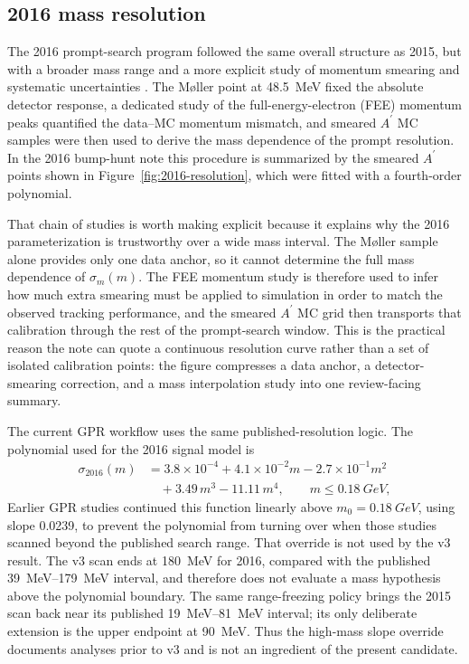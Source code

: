 \subsection{2016 mass resolution}
\label{sec:massres-2016}

The 2016 prompt-search program followed the same overall structure as 2015, but with a
broader mass range and a more explicit study of momentum smearing and systematic
uncertainties \cite{HPS2016BumpInternal,HPS2016PromptLong}. The M{\o}ller point at
\SI{48.5}{MeV} fixed the absolute detector response, a dedicated study of the
full-energy-electron (FEE)
momentum peaks quantified the data--MC momentum mismatch, and smeared $A^\prime$ MC
samples were then used to derive the mass dependence of the prompt resolution. In the
2016 bump-hunt note this procedure is summarized by the smeared $A^\prime$ points shown
in Figure~\ref{fig:2016-resolution}, which were fitted with a fourth-order polynomial.

That chain of studies is worth making explicit because it explains why the 2016
parameterization is trustworthy over a wide mass interval. The M{\o}ller sample alone
provides only one data anchor, so it cannot determine the full mass dependence of
$\sigma_m(m)$. The FEE momentum study is therefore used to infer how much extra
smearing must be applied to simulation in order to match the observed tracking
performance, and the smeared $A^\prime$ MC grid then transports that calibration
through the rest of the prompt-search window. This is the practical reason the note can
quote a continuous resolution curve rather than a set of isolated calibration points:
the figure compresses a data anchor, a detector-smearing correction, and a mass
interpolation study into one review-facing summary.

The current GPR workflow uses the same published-resolution logic. The polynomial used
for the 2016 signal model is
\begin{align}
\sigma_{2016}(m) &= 3.8\times10^{-4} + 4.1\times10^{-2}m - 2.7\times10^{-1}m^2 \nonumber\\
&\quad + 3.49\,m^3 - 11.11\,m^4,
\qquad m \le \SI{0.18}{GeV},
\label{eq:sigma2016}
\end{align}
Earlier GPR studies continued this function linearly above
$m_0=\SI{0.18}{GeV}$, using slope \num{0.0239}, to prevent the polynomial from turning
over when those studies scanned beyond the published search range. That override is
not used by the v3 result. The v3 scan ends at \SI{180}{MeV} for 2016, compared with
the published \SIrange{39}{179}{MeV} interval, and therefore does not evaluate a mass
hypothesis above the polynomial boundary. The same range-freezing policy brings the
2015 scan back near its published \SIrange{19}{81}{MeV} interval; its only deliberate
extension is the upper endpoint at \SI{90}{MeV}. Thus the high-mass slope override
documents analyses prior to v3 and is not an ingredient of the present candidate.

